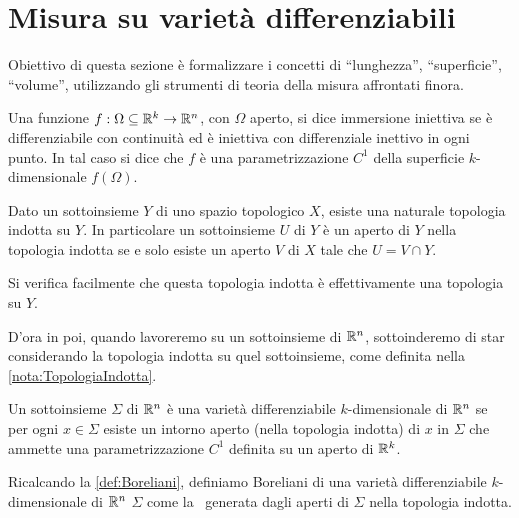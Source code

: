 \section{Misura su varietà differenziabili}
Obiettivo di questa sezione è formalizzare i concetti di ``lunghezza'', ``superficie'', ``volume'', utilizzando gli strumenti di teoria della misura affrontati finora. 

\begin{definition}
	Una funzione $f:\Omega \subseteq \mathbb R^k\to\mathbb R^n$, con $\Omega$ aperto, si dice immersione iniettiva se è differenziabile con continuità ed è iniettiva con differenziale inettivo in ogni punto. In tal caso si dice che $f$ è una parametrizzazione $C^1$ della superficie $k$-dimensionale $f(\Omega)$.
\end{definition}

\begin{remark}\label{nota:TopologiaIndotta}
	Dato un sottoinsieme $Y$ di uno spazio topologico $X$, esiste una naturale topologia indotta su $Y$. In particolare un sottoinsieme $U$ di $Y$ è un aperto di $Y$ nella topologia indotta se e solo esiste un aperto $V$ di $X$ tale che $U=V\cap Y$. 
	
	Si verifica facilmente che questa topologia indotta è effettivamente una topologia su $Y$.
\end{remark}

D'ora in poi, quando lavoreremo su un sottoinsieme di $\mathbb R^n$, sottoinderemo di star considerando la topologia indotta su quel sottoinsieme, come definita nella \cref{nota:TopologiaIndotta}.

\begin{definition}
	Un sottoinsieme $\Sigma$ di $\mathbb R^n$ è una varietà differenziabile $k$-dimensionale di $\mathbb R^n$ se per ogni $x\in\Sigma$ esiste un intorno aperto (nella topologia indotta) di $x$ in $\Sigma$ che ammette una parametrizzazione $C^1$ definita su un aperto di $\mathbb R^k$.
\end{definition}

\begin{definition}\label{def:BorelianiVarieta}
	Ricalcando la \cref{def:Boreliani}, definiamo Boreliani di una varietà differenziabile $k$-dimensionale di $\mathbb R^n$ $\Sigma$ come la \sigalg\ generata dagli aperti di $\Sigma$ nella topologia indotta.
\end{definition}


